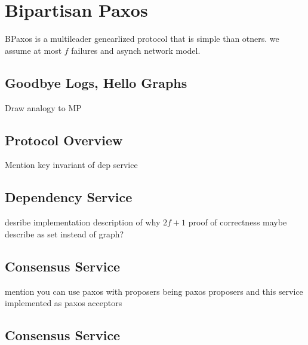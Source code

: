\section{Bipartisan Paxos}
BPaxos is a multileader genearlized protocol that is simple than otners. we
assume at most $f$ failures and asynch network model.

\subsection{Goodbye Logs, Hello Graphs}
Draw analogy to MP
{}

\subsection{Protocol Overview}
Mention key invariant of dep service

\subsection{Dependency Service}
desribe implementation
description of why $2f+1$
proof of correctness
maybe describe as set instead of graph?

\subsection{Consensus Service}
mention you can use paxos with proposers being paxos proposers and this service
implemented as paxos acceptors

\subsection{Consensus Service}
